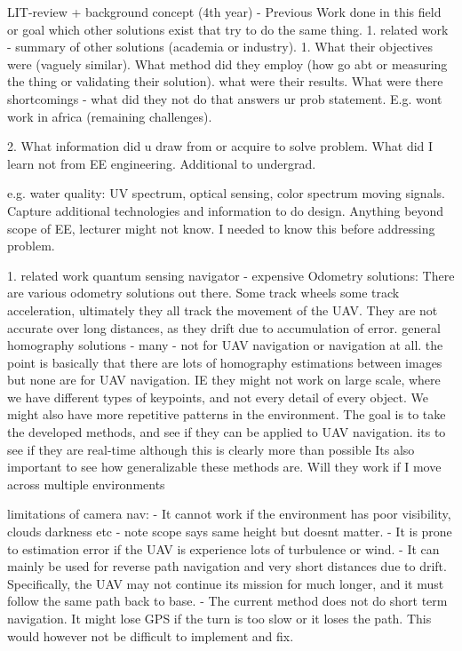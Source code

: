 


LIT-review + background concept (4th year)
- Previous Work done in this field or goal
which other solutions exist that try to do the same thing. 
1. related work - summary of other solutions (academia or industry). 1.  What their objectives were (vaguely similar). What method did they employ (how go abt or measuring the thing or validating their solution). what were their results. What were there shortcomings - what did they not do that answers ur prob statement. E.g. wont work in africa (remaining challenges).

2. What information did u draw from or acquire to solve problem. What did I learn not from EE engineering. Additional to undergrad. 

e.g. water quality: UV spectrum, optical sensing, color spectrum moving signals. Capture additional technologies and information to do design. Anything beyond scope of EE, lecturer might not know. I needed to know this before addressing problem. 


1. related work
quantum sensing navigator - expensive
Odometry solutions: There are various odometry solutions out there. Some track wheels some track acceleration, ultimately they all track the movement of the UAV. They are not accurate over long distances, as they drift due to accumulation of error. 
general homography solutions - many - not for UAV navigation or navigation at all. 
the point is basically that there are lots of homography estimations between images but none are for UAV navigation. IE they might not work on large scale, where we have different types of keypoints, and not every detail of every object. We might also have more repetitive patterns in the environment.
The goal is to take the developed methods, and see if they can be applied to UAV navigation.
its to see if they are real-time although this is clearly more than possible
Its also important to see how generalizable these methods are. Will they work if I move across multiple environments

limitations of camera nav: 
- It cannot work if the environment has poor visibility, clouds darkness etc
- note scope says same height but doesnt matter. 
- It is prone to estimation error if the UAV is experience lots of turbulence or wind.
- It can mainly be used for reverse path navigation and very short distances due to drift. Specifically, the UAV may not continue its mission for much longer, and it must follow the same path back to base.
- The current method does not do short term navigation. It might lose GPS if the turn is too slow or it loses the path. This would however not be difficult to implement and fix. 


